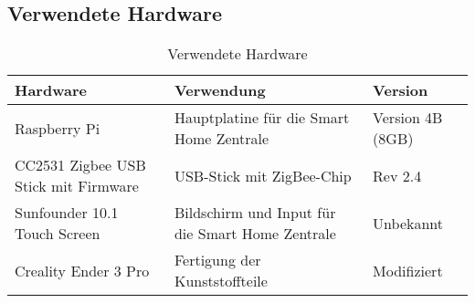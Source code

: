 \subsection{Verwendete Hardware}\label{qu_hardware}
\begin{table}[H]
\begin{tabularx}{\textwidth}{|p{5cm}|p{6cm}|p{3.2cm}|}
    	\hline
 	    \textbf{Hardware} & \textbf{Verwendung} & \textbf{Version} \\
    	\hline
    	\hline
    	Raspberry Pi & Hauptplatine für die Smart Home Zentrale & Version 4B (8GB)\\
 	    \hline
 	    CC2531 Zigbee USB Stick mit Firmware & USB-Stick mit ZigBee-Chip & Rev 2.4\\
    	\hline
    	Sunfounder 10.1 Touch Screen  & Bildschirm und Input für die Smart Home Zentrale & Unbekannt\\
 	    \hline
 	    Creality Ender 3 Pro & Fertigung der Kunststoffteile & Modifiziert\\
 	    \hline
    \end{tabularx}
    \caption{Verwendete Hardware}
    \label{tab:qu_hardware}
\end{table}
